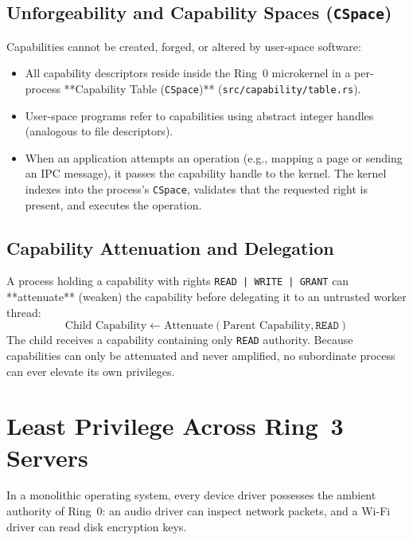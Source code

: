 \subsection{Unforgeability and Capability Spaces (\texttt{CSpace})}
Capabilities cannot be created, forged, or altered by user-space software:
\begin{itemize}
    \item All capability descriptors reside inside the Ring~0 microkernel in a per-process **Capability Table (\texttt{CSpace})** (\texttt{src/capability/table.rs}).
    \item User-space programs refer to capabilities using abstract integer handles (analogous to file descriptors).
    \item When an application attempts an operation (e.g., mapping a page or sending an IPC message), it passes the capability handle to the kernel. The kernel indexes into the process's \texttt{CSpace}, validates that the requested right is present, and executes the operation.
\end{itemize}

\subsection{Capability Attenuation and Delegation}
A process holding a capability with rights \texttt{READ | WRITE | GRANT} can **attenuate** (weaken) the capability before delegating it to an untrusted worker thread:
\begin{equation}
    \text{Child Capability} \longleftarrow \text{Attenuate}(\text{Parent Capability}, \texttt{READ})
\end{equation}
The child receives a capability containing only \texttt{READ} authority. Because capabilities can only be attenuated and never amplified, no subordinate process can ever elevate its own privileges.

\section{Least Privilege Across Ring~3 Servers}
\label{sec:least_privilege}

In a monolithic operating system, every device driver possesses the ambient authority of Ring~0: an audio driver can inspect network packets, and a Wi-Fi driver can read disk encryption keys.

